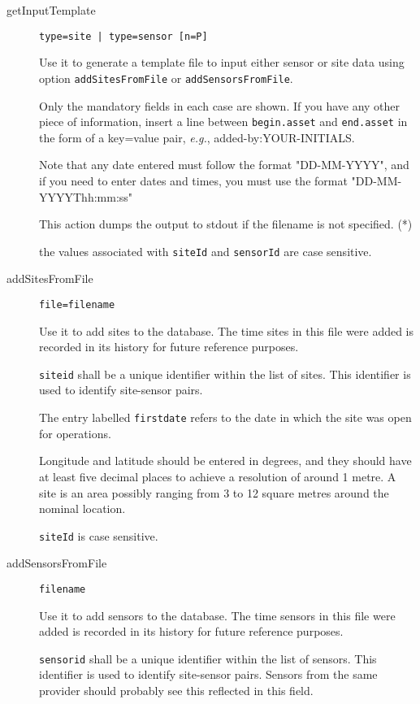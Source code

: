 \documentclass[12pt]{amsart}
\begin{document}
\begin{description}
\item[getInputTemplate] {\tt type=site | type=sensor [n=P]} 

Use it to generate a template file to input either sensor or site data using option {\tt addSitesFromFile} or {\tt addSensorsFromFile}.

Only the mandatory fields in each case are shown. If you have any other piece of information, insert a line between {\tt begin.asset} and {\tt end.asset} in the form of a key=value pair, {\it e.g.}, added-by:YOUR-INITIALS. 

Note that any date entered must follow the format "DD-MM-YYYY", and if you need to enter dates and times, you must use the format "DD-MM-YYYYThh:mm:ss"

This action dumps the output to stdout if the filename is not specified. (*)

 the values associated with {\tt siteId} and {\tt sensorId} are case sensitive.

\item[addSitesFromFile] {\tt file=filename} 

Use it to add sites to the database.  The time sites in this file were added is recorded in its history for future reference purposes.

{\tt siteid} shall be a unique identifier within the list of sites. This identifier is used to identify site-sensor pairs.

The entry labelled {\tt firstdate} refers to the date in which the site was open for operations.

Longitude and latitude should be entered in degrees, and they should have at least five decimal places to achieve a resolution of around 1 metre. A site is an area possibly ranging from 3 to 12 square metres around the nominal location.

 {\tt siteId} is case sensitive.

\item[addSensorsFromFile] {\tt filename }

Use it to add sensors to the database.  The time sensors in this file were added is recorded in its history for future reference purposes.

{\tt sensorid} shall be a unique identifier within the list of sensors. This identifier is used to identify site-sensor pairs. Sensors from the same provider should probably see this reflected in this field.


\end{description}
\end{document}
